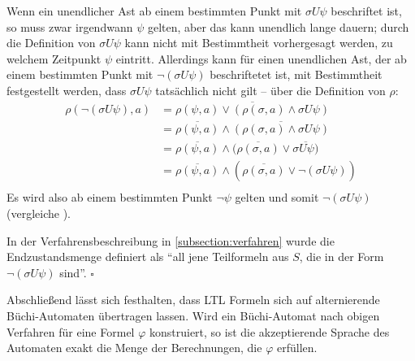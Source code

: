 Wenn ein unendlicher Ast ab einem bestimmten Punkt mit $\sigma U\psi$ beschriftet ist, so muss zwar irgendwann $\psi$ gelten, aber das kann unendlich lange dauern; durch die Definition von $\sigma U\psi$ kann nicht mit Bestimmtheit vorhergesagt werden, zu welchem Zeitpunkt $\psi$ eintritt. Allerdings kann für einen unendlichen Ast, der ab einem bestimmten Punkt mit $\lnot(\sigma U\psi)$ beschriftetet ist, mit Bestimmtheit festgestellt werden, dass $\sigma U\psi$ tatsächlich nicht gilt -- über die Definition von $\rho$:
\begin{equation}
\begin{split}
    \rho(\lnot(\sigma U\psi), a) &= \overline{\rho(\psi, a) \lor (\rho(\sigma, a) \land \sigma U\psi)}\\
    &= \overline{\rho(\psi, a)} \land \overline{(\rho(\sigma, a) \land \sigma U\psi)}\\
    &= \overline{\rho(\psi, a)} \land (\overline{\rho(\sigma, a)} \lor \overline{\sigma U\psi)}\\
    &= \overline{\rho(\psi, a)} \land (\overline{\rho(\sigma, a)} \lor \lnot(\sigma U\psi))\\
\end{split}
\end{equation}
Es wird also ab einem bestimmten Punkt $\lnot\psi$ gelten und somit $\lnot(\sigma U\psi)$ (vergleiche \cite{vardi+96}).

In der Verfahrensbeschreibung in \ref{subsection:verfahren} wurde die Endzustandsmenge definiert als "`all jene Teilformeln aus $S$, die in der Form $\lnot(\sigma U\psi)$ sind"'. $\square$

Abschließend lässt sich festhalten, dass LTL Formeln sich auf alternierende Büchi-Automaten übertragen lassen. Wird ein Büchi-Automat nach obigen Verfahren für eine Formel $\varphi$ konstruiert, so ist die akzeptierende Sprache des Automaten exakt die Menge der Berechnungen, die $\varphi$ erfüllen.